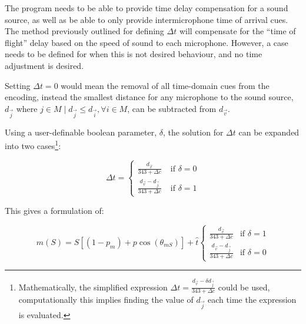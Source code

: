 The program needs to be able to provide time delay compensation for a sound source, as well as be able to only provide intermicrophone time of arrival cues. The method previously outlined for defining $\Delta{}t$ will compensate for the ``time of flight'' delay based on the speed of sound to each microphone. However, a case needs to be defined for when this is not desired behaviour, and no time adjustment is desired.

Setting $\Delta{}t = 0$ would mean the removal of all time-domain cues from the encoding, instead the smallest distance for any microphone to the sound source, $d_{\vec{j}}$ where $j \in M \; | \; d_{\vec{j}} \leq d_{\vec{i}} , \forall{}i \in M$, can be subtracted from $d_{\vec{v}}$.

Using a user-definable boolean parameter, $\delta$, the solution for $\Delta{}t$ can be expanded into two cases\footnote{Mathematically, the simplified expression $\Delta{}t = \frac{d_{\vec{v}} - \delta{}d_{\vec{j}}}{343 + \Delta{}c}$ could be used, computationally this implies finding the value of $d_{\vec{j}}$ each time the expression is evaluated.}:

\begin{equation}
\Delta{}t = \begin{cases}
\frac{d_{\vec{v}}}{343 + \Delta{}c} \; & \text{if } \delta = 0 
\\[12pt]
\frac{d_{\vec{v}} - d_{\vec{j}}}{343 + \Delta{}c} \; & \text{if } \delta = 1
\end{cases}
\end{equation}

This gives a formulation of:

\begin{equation}
m(S) = S\left[\left(1 - p_m\right) + p\cos(\theta_{mS})\right] + \hat{t}
\begin{cases}
\frac{d_{\vec{v}}}{343 + \Delta{}c} & \text{if } \delta = 1 \\[10pt]
\frac{d_{\vec{v}} - d_{\vec{j}}}{343 + \Delta{}c} & \text{if } \delta = 0
\end {cases}
\end{equation}


